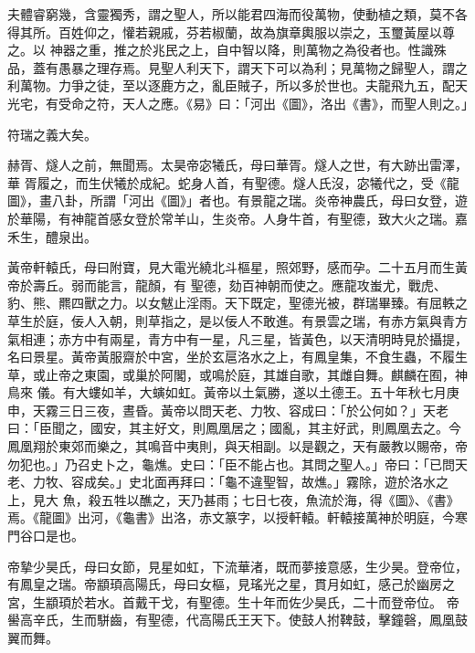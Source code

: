 
\begin{pinyinscope}

 夫體睿窮幾，含靈獨秀，謂之聖人，所以能君四海而役萬物，使動植之類，莫不各得其所。百姓仰之，懽若親戚，芬若椒蘭，故為旗章輿服以崇之，玉璽黃屋以尊之。以
 神器之重，推之於兆民之上，自中智以降，則萬物之為役者也。性識殊品，蓋有愚暴之理存焉。見聖人利天下，謂天下可以為利；見萬物之歸聖人，謂之利萬物。力爭之徒，至以逐鹿方之，亂臣賊子，所以多於世也。夫龍飛九五，配天光宅，有受命之符，天人之應。《易》曰：「河出《圖》，洛出《書》，而聖人則之。」



 符瑞之義大矣。



 赫胥、燧人之前，無聞焉。太昊帝宓犧氏，母曰華胥。燧人之世，有大跡出雷澤，華
 胥履之，而生伏犧於成紀。蛇身人首，有聖德。燧人氏沒，宓犧代之，受《龍圖》，畫八卦，所謂「河出《圖》」者也。有景龍之瑞。炎帝神農氏，母曰女登，遊於華陽，有神龍首感女登於常羊山，生炎帝。人身牛首，有聖德，致大火之瑞。嘉禾生，醴泉出。



 黃帝軒轅氏，母曰附寶，見大電光繞北斗樞星，照郊野，感而孕。二十五月而生黃帝於壽丘。弱而能言，龍顏，有
 聖德，劾百神朝而使之。應龍攻蚩尤，戰虎、豹、熊、羆四獸之力。以女魃止淫雨。天下既定，聖德光被，群瑞畢臻。有屈軼之草生於庭，佞人入朝，則草指之，是以佞人不敢進。有景雲之瑞，有赤方氣與青方氣相連；赤方中有兩星，青方中有一星，凡三星，皆黃色，以天清明時見於攝提，名曰景星。黃帝黃服齋於中宮，坐於玄扈洛水之上，有鳳皇集，不食生蟲，不履生草，或止帝之東園，或巢於阿閣，或鳴於庭，其雄自歌，其雌自舞。麒麟在囿，神鳥來
 儀。有大螻如羊，大螾如虹。黃帝以土氣勝，遂以土德王。五十年秋七月庚申，天霧三日三夜，晝昏。黃帝以問天老、力牧、容成曰：「於公何如？」天老曰：「臣聞之，國安，其主好文，則鳳凰居之；國亂，其主好武，則鳳凰去之。今鳳凰翔於東郊而樂之，其鳴音中夷則，與天相副。以是觀之，天有嚴教以賜帝，帝勿犯也。」乃召史卜之，龜燋。史曰：「臣不能占也。其問之聖人。」帝曰：「已問天老、力牧、容成矣。」史北面再拜曰：「龜不違聖智，故燋。」霧除，遊於洛水之上，見大
 魚，殺五牲以醮之，天乃甚雨；七日七夜，魚流於海，得《圖》、《書》焉。《龍圖》出河，《龜書》出洛，赤文篆字，以授軒轅。軒轅接萬神於明庭，今寒門谷口是也。



 帝摯少昊氏，母曰女節，見星如虹，下流華渚，既而夢接意感，生少昊。登帝位，有鳳皇之瑞。帝顓頊高陽氏，母曰女樞，見瑤光之星，貫月如虹，感己於幽房之宮，生顓頊於若水。首戴干戈，有聖德。生十年而佐少昊氏，二十而登帝位。
 帝嚳高辛氏，生而駢齒，有聖德，代高陽氏王天下。使鼓人拊鞞鼓，擊鐘磬，鳳凰鼓翼而舞。




\end{pinyinscope}

